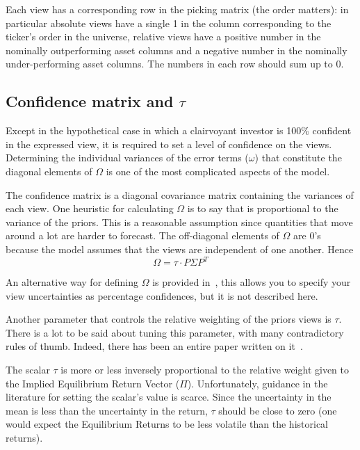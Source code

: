 Each view has a corresponding row in the picking matrix (the order matters): in particular absolute views have a single 1 in the column corresponding to the ticker’s order in the universe, relative views have a positive number in the nominally outperforming asset columns and a negative number in the nominally under-performing asset columns. The numbers in each row should sum up to 0.

\subsection{Confidence matrix and $\tau$}

Except in the hypothetical case in which a clairvoyant investor is 100\% confident in the expressed view, it is required to set a level of confidence on the views. Determining the individual variances of the error terms ($\omega$) that constitute the diagonal elements of $\Omega$ is one of the most complicated aspects of the model.

The confidence matrix is a diagonal covariance matrix containing the variances of each view. One heuristic for calculating $\Omega$ is to say that is proportional to the variance of the priors. This is a reasonable assumption since quantities that move around a lot are harder to forecast. The off-diagonal elements of $\Omega$ are 0’s because the model assumes that the views are independent of one another. Hence 
\begin{equation}
\Omega = \tau \cdot P\Sigma P^T
\end{equation}

An alternative way for defining $\Omega$ is provided in~\cite{bib:Idzorek}, this allows you to specify your view uncertainties as percentage confidences, but it is not described here.

Another parameter that controls the relative weighting of the priors views is $\tau$. There is a lot to be said about tuning this parameter, with many contradictory rules of thumb. Indeed, there has been an entire paper written on it~\cite{bib:tau}. 

The scalar $\tau$ is more or less inversely proportional to the relative weight given to the Implied Equilibrium Return Vector ($\Pi$). Unfortunately, guidance in the literature for setting the scalar’s value is scarce. Since the uncertainty in the mean is less than the uncertainty in the return, $\tau$ should be close to zero (one would expect the Equilibrium Returns to be less volatile than the historical returns).

